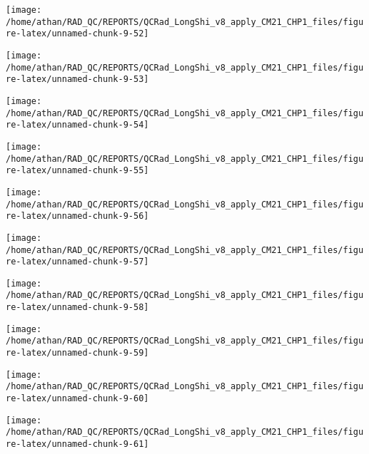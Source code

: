 \documentclass[
  10pt,
  a4paper,oneside]{article}
\begin{document}
\begin{center}\texttt{[image: /home/athan/RAD\_QC/REPORTS/QCRad\_LongShi\_v8\_apply\_CM21\_CHP1\_files/figure-latex/unnamed-chunk-9-52]} \end{center}

\begin{center}\texttt{[image: /home/athan/RAD\_QC/REPORTS/QCRad\_LongShi\_v8\_apply\_CM21\_CHP1\_files/figure-latex/unnamed-chunk-9-53]} \end{center}

\begin{center}\texttt{[image: /home/athan/RAD\_QC/REPORTS/QCRad\_LongShi\_v8\_apply\_CM21\_CHP1\_files/figure-latex/unnamed-chunk-9-54]} \end{center}

\begin{center}\texttt{[image: /home/athan/RAD\_QC/REPORTS/QCRad\_LongShi\_v8\_apply\_CM21\_CHP1\_files/figure-latex/unnamed-chunk-9-55]} \end{center}

\begin{center}\texttt{[image: /home/athan/RAD\_QC/REPORTS/QCRad\_LongShi\_v8\_apply\_CM21\_CHP1\_files/figure-latex/unnamed-chunk-9-56]} \end{center}

\begin{center}\texttt{[image: /home/athan/RAD\_QC/REPORTS/QCRad\_LongShi\_v8\_apply\_CM21\_CHP1\_files/figure-latex/unnamed-chunk-9-57]} \end{center}

\begin{center}\texttt{[image: /home/athan/RAD\_QC/REPORTS/QCRad\_LongShi\_v8\_apply\_CM21\_CHP1\_files/figure-latex/unnamed-chunk-9-58]} \end{center}

\begin{center}\texttt{[image: /home/athan/RAD\_QC/REPORTS/QCRad\_LongShi\_v8\_apply\_CM21\_CHP1\_files/figure-latex/unnamed-chunk-9-59]} \end{center}

\begin{center}\texttt{[image: /home/athan/RAD\_QC/REPORTS/QCRad\_LongShi\_v8\_apply\_CM21\_CHP1\_files/figure-latex/unnamed-chunk-9-60]} \end{center}

\begin{center}\texttt{[image: /home/athan/RAD\_QC/REPORTS/QCRad\_LongShi\_v8\_apply\_CM21\_CHP1\_files/figure-latex/unnamed-chunk-9-61]} \end{center}
\end{document}
